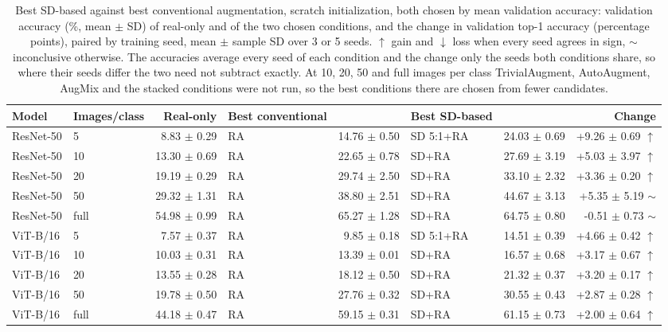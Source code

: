 \begin{table}[H]
\centering
\small
\setlength{\tabcolsep}{4pt}
\caption{Best SD-based against best conventional augmentation, scratch initialization, both chosen by mean validation accuracy: validation accuracy (\%, mean $\pm$ SD) of real-only and of the two chosen conditions, and the change in validation top-1 accuracy (percentage points), paired by training seed, mean $\pm$ sample SD over 3 or 5 seeds. $\uparrow$ gain and $\downarrow$ loss when every seed agrees in sign, $\sim$ inconclusive otherwise. The accuracies average every seed of each condition and the change only the seeds both conditions share, so where their seeds differ the two need not subtract exactly. At 10, 20, 50 and full images per class TrivialAugment, AutoAugment, AugMix and the stacked conditions were not run, so the best conditions there are chosen from fewer candidates.}
\label{tab:augment-best-scratch}
\begin{tabular}{llrlrlrr}
\toprule
Model & Images/class & Real-only & Best conventional & & Best SD-based & & Change \\
\midrule
ResNet-50 & 5 & 8.83 $\pm$ 0.29 & RA & 14.76 $\pm$ 0.50 & SD 5:1+RA & 24.03 $\pm$ 0.69 & +9.26 $\pm$ 0.69 $\uparrow$ \\
ResNet-50 & 10 & 13.30 $\pm$ 0.69 & RA & 22.65 $\pm$ 0.78 & SD+RA & 27.69 $\pm$ 3.19 & +5.03 $\pm$ 3.97 $\uparrow$ \\
ResNet-50 & 20 & 19.19 $\pm$ 0.29 & RA & 29.74 $\pm$ 2.50 & SD+RA & 33.10 $\pm$ 2.32 & +3.36 $\pm$ 0.20 $\uparrow$ \\
ResNet-50 & 50 & 29.32 $\pm$ 1.31 & RA & 38.80 $\pm$ 2.51 & SD+RA & 44.67 $\pm$ 3.13 & +5.35 $\pm$ 5.19 $\sim$ \\
ResNet-50 & full & 54.98 $\pm$ 0.99 & RA & 65.27 $\pm$ 1.28 & SD+RA & 64.75 $\pm$ 0.80 & -0.51 $\pm$ 0.73 $\sim$ \\
ViT-B/16 & 5 & 7.57 $\pm$ 0.37 & RA & 9.85 $\pm$ 0.18 & SD 5:1+RA & 14.51 $\pm$ 0.39 & +4.66 $\pm$ 0.42 $\uparrow$ \\
ViT-B/16 & 10 & 10.03 $\pm$ 0.31 & RA & 13.39 $\pm$ 0.01 & SD+RA & 16.57 $\pm$ 0.68 & +3.17 $\pm$ 0.67 $\uparrow$ \\
ViT-B/16 & 20 & 13.55 $\pm$ 0.28 & RA & 18.12 $\pm$ 0.50 & SD+RA & 21.32 $\pm$ 0.37 & +3.20 $\pm$ 0.17 $\uparrow$ \\
ViT-B/16 & 50 & 19.78 $\pm$ 0.50 & RA & 27.76 $\pm$ 0.32 & SD+RA & 30.55 $\pm$ 0.43 & +2.87 $\pm$ 0.28 $\uparrow$ \\
ViT-B/16 & full & 44.18 $\pm$ 0.47 & RA & 59.15 $\pm$ 0.31 & SD+RA & 61.15 $\pm$ 0.73 & +2.00 $\pm$ 0.64 $\uparrow$ \\
\bottomrule
\end{tabular}
\end{table}
